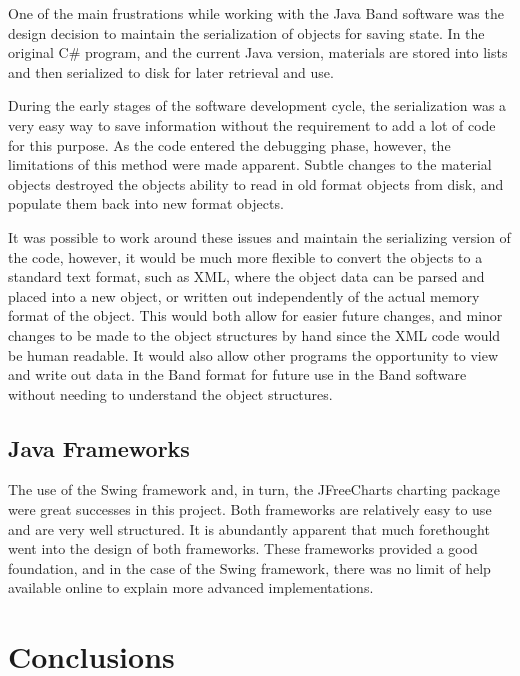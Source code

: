 \documentclass[project]{bsu-ms}
\begin{document}
One of the main frustrations while working with the Java Band software was the design decision to maintain the serialization of objects for saving state. In the original C\# program, and the current Java version, materials are stored into lists and then serialized to disk for later retrieval and use. 

During the early stages of the software development cycle, the serialization was a very easy way to save information without the requirement to add a lot of code for this purpose. As the code entered the debugging phase, however, the limitations of this method were made apparent. Subtle changes to the material objects destroyed the objects ability to read in old format objects from disk, and populate them back into new format objects. 

It was possible to work around these issues and maintain the serializing version of the code, however, it would be much more flexible to convert the objects to a standard text format, such as XML, where the object data can be parsed and placed into a new object, or written out independently of the actual memory format of the object. This would both allow for easier future changes, and minor changes to be made to the object structures by hand since the XML code would be human readable. It would also allow other programs the opportunity to view and write out data in the Band format for future use in the Band software without needing to understand the object structures.

\section{Java Frameworks}\label{sec:javaFrameworks}

The use of the Swing framework and, in turn, the JFreeCharts charting package were great successes in this project. Both frameworks are relatively easy to use and are very well structured. It is abundantly apparent that much forethought went into the design of both frameworks. These frameworks provided a good foundation, and in the case of the Swing framework, there was no limit of help available online to explain more advanced implementations.




%
%
\chapter{Conclusions}\label{ch:conclusions}
\end{document}
